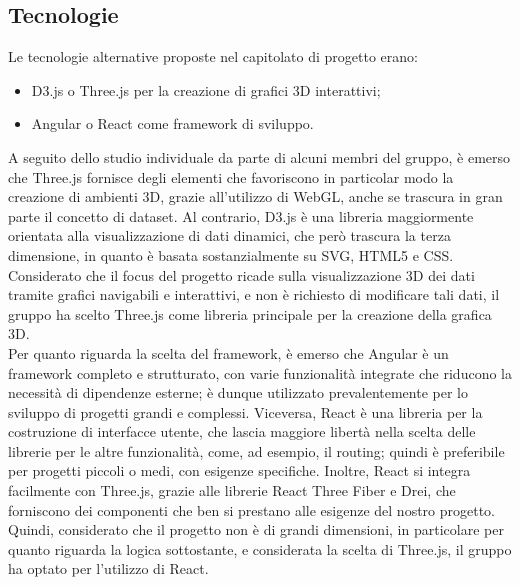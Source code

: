     \subsection{Tecnologie}
        Le tecnologie alternative proposte nel capitolato di progetto erano:
        \begin{itemize}
            \item D3.js o Three.js per la creazione di grafici 3D interattivi;
            \item Angular o React come framework di sviluppo.       
        \end{itemize}
        A seguito dello studio individuale da parte di alcuni membri del gruppo,
        è emerso che Three.js fornisce degli elementi che favoriscono in particolar
        modo la creazione di ambienti 3D, grazie all'utilizzo di WebGL, 
        anche se trascura in gran parte il concetto di dataset. 
        Al contrario, D3.js è una libreria maggiormente orientata
        alla visualizzazione di dati dinamici, che però trascura la terza dimensione,
        in quanto è basata sostanzialmente su SVG, HTML5 e CSS. 
        Considerato che il focus del progetto ricade sulla visualizzazione 3D dei 
        dati tramite grafici navigabili e interattivi, e non è richiesto di modificare
        tali dati, il gruppo ha scelto Three.js come libreria principale per la creazione 
        della grafica 3D.\\
        Per quanto riguarda la scelta del framework, è emerso che Angular è un framework
        completo e strutturato, con varie funzionalità integrate che riducono la necessità di dipendenze esterne;
        è dunque utilizzato prevalentemente per lo sviluppo di progetti grandi e complessi. 
        Viceversa, React è una libreria per la costruzione di interfacce utente, 
        che lascia maggiore libertà nella scelta delle librerie per le altre funzionalità,
        come, ad esempio, il routing; quindi è preferibile per progetti piccoli o medi, con esigenze specifiche.
        Inoltre, React si integra facilmente con Three.js, grazie alle 
        librerie React Three Fiber e Drei, che forniscono dei componenti che ben si 
        prestano alle esigenze del nostro progetto.
        Quindi, considerato che il progetto non è di grandi dimensioni, in particolare per quanto 
        riguarda la logica sottostante, e considerata la scelta di Three.js, il gruppo ha 
        optato per l'utilizzo di React.        
